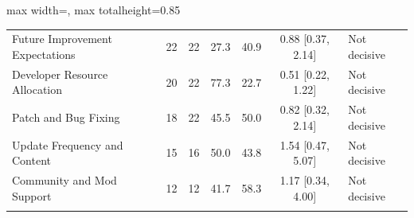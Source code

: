 \begin{table}[htbp]
\begin{adjustbox}{max width=\linewidth, max totalheight=0.85\textheight}
\begin{tabular}{l r r r r c l}
    Future Improvement Expectations & 22 & 22 & 27.3 & 40.9 & 0.88 [0.37, 2.14] & Not decisive \\
    Developer Resource Allocation & 20 & 22 & 77.3 & 22.7 & 0.51 [0.22, 1.22] & Not decisive \\
    Patch and Bug Fixing & 18 & 22 & 45.5 & 50.0 & 0.82 [0.32, 2.14] & Not decisive \\
    Update Frequency and Content & 15 & 16 & 50.0 & 43.8 & 1.54 [0.47, 5.07] & Not decisive \\
    Community and Mod Support & 12 & 12 & 41.7 & 58.3 & 1.17 [0.34, 4.00] & Not decisive \\
    \arrayrulecolor{black}\bottomrule
  \end{tabular}
  \end{adjustbox}
\end{table}
